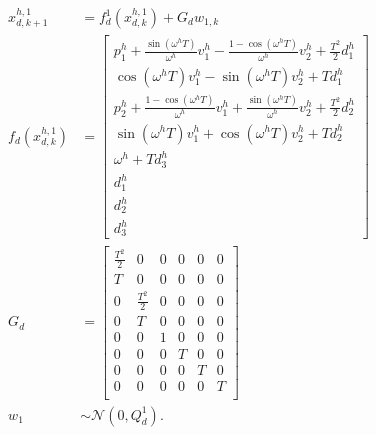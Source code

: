 \documentclass[journal]{IEEEtran}
\begin{document}
	\begin{subequations}
		\begin{align*}
			x_{d,k+1}^{h,1}&= f^1_d(x_{d,k}^{h,1})+G_dw_{1,k} \\ 
			f_d(x_{d,k}^{h,1})&=\left[
			\begin{array}{c}
				p^h_1+\frac{\sin(\omega^h T)}{\omega^h}v^h_1-\frac{1-\cos(\omega^h T)}{\omega^h}v^h_2+\frac{T^2}{2}d^h_1\\
				\cos(\omega^h T)v^h_1-\sin(\omega^h T)v^h_2+Td^h_1\\
				p^h_2+\frac{1-\cos(\omega^h T)}{\omega^h}v^h_1+\frac{\sin(\omega^h T)}{\omega^h}v^h_2+\frac{T^2}{2}d^h_2\\
				\sin(\omega^h T)v^h_1+\cos(\omega^h T)v^h_2+Td^h_2\\
				\omega^h+Td^h_3\\
                d^h_1\\
                d^h_2\\
                d^h_3
			\end{array}\right] \\
			G_d &= \left[
			\begin{array}{cccccc}
				\frac{T^2}{2}& 0& 0&0 &0 &0\\
				T& 0& 0& 0& 0& 0\\
				0& \frac{T^2}{2}& 0& 0& 0& 0\\
				0& T& 0& 0& 0& 0\\
				0& 0& 1& 0& 0& 0\\ 
                0& 0& 0& T& 0& 0\\
                0& 0& 0& 0& T& 0\\
                0& 0& 0& 0& 0& T\\
			\end{array}\right] \\
			w_1&\sim\mathcal{N}(0,Q^1_d).
		\end{align*}
	\end{subequations}\normalsize
	
\end{document}
